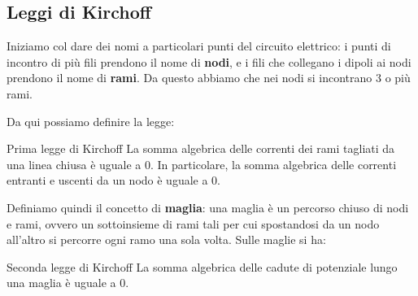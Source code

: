 \documentclass[a4paper,11pt]{article}
\begin{document}
\subsection{Leggi di Kirchoff}
Iniziamo col dare dei nomi a particolari punti del circuito elettrico: i punti di incontro di più fili prendono il nome di \textbf{nodi}, e i fili che collegano i dipoli ai nodi prendono il nome di \textbf{rami}.
Da questo abbiamo che nei nodi si incontrano 3 o più rami.

Da qui possiamo definire la legge:
\begin{theorem}{Prima legge di Kirchoff}
		La somma algebrica delle correnti dei rami tagliati da una linea chiusa è uguale a 0.
		In particolare, la somma algebrica delle correnti entranti e uscenti da un nodo è uguale a 0.
\end{theorem}

Definiamo quindi il concetto di \textbf{maglia}: una maglia è un percorso chiuso di nodi e rami, ovvero un sottoinsieme di rami tali per cui spostandosi da un nodo all'altro si percorre ogni ramo una sola volta.
Sulle maglie si ha:

\begin{theorem}{Seconda legge di Kirchoff}
	La somma algebrica delle cadute di potenziale lungo una maglia è uguale a 0.
\end{theorem}
\end{document}
